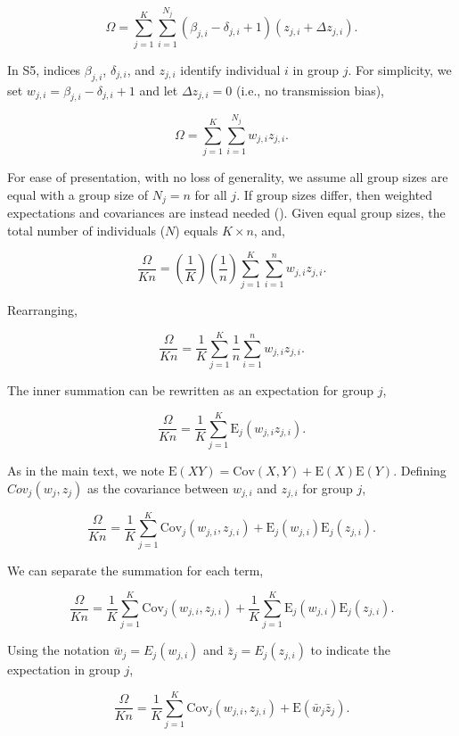 \documentclass[
]{article}
\begin{document}
\[\Omega = \sum_{j=1}^{K}\sum_{i=1}^{N_{j}}\left(\beta_{j,i} - \delta_{j,i} + 1 \right)\left(z_{j, i} + \Delta z_{j, i}\right).
\tag{S5}
\]

In S5, indices \(\beta_{j, i}\), \(\delta_{j, i}\), and \(z_{j, i}\)
identify individual \(i\) in group \(j\). For simplicity, we set
\(w_{j, i} = \beta_{j, i} - \delta_{j, i} + 1\) and let
\(\Delta z_{j, i} = 0\) (i.e., no transmission bias),

\[\Omega = \sum_{j=1}^{K}\sum_{i=1}^{N_{j}}w_{j,i}z_{j, i}.\]

For ease of presentation, with no loss of generality, we assume all
group sizes are equal with a group size of \(N_{j} = n\) for all \(j\).
If group sizes differ, then weighted expectations and covariances are
instead needed (). Given
equal group sizes, the total number of individuals (\(N\)) equals
\(K \times n\), and,

\[\frac{\Omega}{K n} = \left(\frac{1}{K}\right)\left(\frac{1}{n}\right)\sum_{j=1}^{K}\sum_{i=1}^{n}w_{j,i}z_{j, i}.\]

Rearranging,

\[\frac{\Omega}{K n} = \frac{1}{K}\sum_{j=1}^{K}\frac{1}{n}\sum_{i=1}^{n}w_{j,i}z_{j, i}.\]

The inner summation can be rewritten as an expectation for group \(j\),

\[\frac{\Omega}{K n} = \frac{1}{K}\sum_{j=1}^{K}\mathrm{E}_{j}\left(w_{j,i} z_{j,i}\right).\]

As in the main text, we note
\(\mathrm{E}(XY) = \mathrm{Cov}(X,Y) + \mathrm{E}(X)\mathrm{E}(Y)\).
Defining \(Cov_{j}(w_{j}, z_{j})\) as the covariance between \(w_{j,i}\)
and \(z_{j, i}\) for group \(j\),

\[\frac{\Omega}{K n} = \frac{1}{K}\sum_{j=1}^{K}\mathrm{Cov}_{j}\left(w_{j,i}, z_{j,i}\right) + \mathrm{E}_{j}\left(w_{j,i}\right)\mathrm{E}_{j}\left(z_{j,i}\right).\]

We can separate the summation for each term,

\[\frac{\Omega}{K n} = \frac{1}{K}\sum_{j=1}^{K}\mathrm{Cov}_{j}\left(w_{j,i}, z_{j,i}\right) + \frac{1}{K}\sum_{j=1}^{K}\mathrm{E}_{j}\left(w_{j,i}\right)\mathrm{E}_{j}\left(z_{j,i}\right).\]

Using the notation \(\bar{w}_{j} = E_{j}(w_{j,i})\) and
\(\bar{z}_{j} = E_{j}(z_{j,i})\) to indicate the expectation in group
\(j\),

\[\frac{\Omega}{K n} = \frac{1}{K}\sum_{j=1}^{K}\mathrm{Cov}_{j}\left(w_{j,i}, z_{j,i}\right) + \mathrm{E}\left(\bar{w}_{j} \bar{z}_{j} \right).\]
\end{document}
